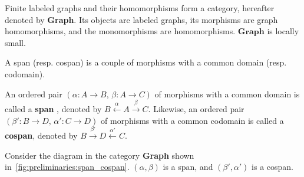 \begin{example} 
    Finite labeled graphs and their homomorphisms form a category, hereafter denoted by \textbf{Graph}. Its objects are labeled graphs, its morphisms are graph homomorphisms, and the monomorphisms are homomorphisms. 
    $\textbf{Graph}$ is locally small. 
\end{example}

 
A span (resp. cospan) is a couple of morphisms with a common domain (resp. codomain).
\begin{definition}
An ordered pair \((\alpha : A \to B,\, \beta : A \to C)\) of morphisms with a common domain is called a \textbf{span} \cite{lowe2010graph}, denoted by
\(
B \overset{\alpha}{\leftarrow} A \overset{\beta}{\rightarrow} C
\). 
Likewise, an ordered pair \((\beta' : B \to D,\, \alpha' : C \to D)\) of morphisms with a common codomain is called a \textbf{cospan}, denoted by
\(
B \overset{\beta'}{\rightarrow} D \overset{\alpha'}{\leftarrow} C
\). 
\end{definition}
\begin{example}
Consider the diagram in the category \textbf{Graph} shown in~\autoref{fig:preliminaries:span_cospan}. $(\alpha, \beta)$ is a span, and $(\beta', \alpha')$ is a cospan.
\end{example}


